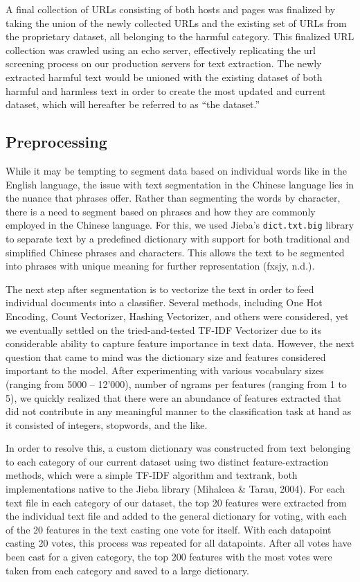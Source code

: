 \documentclass[
  titlepage]{article}
\begin{document}
A final collection of URLs consisting of both hosts and pages was
finalized by taking the union of the newly collected URLs and the
existing set of URLs from the proprietary dataset, all belonging to the
harmful category. This finalized URL collection was crawled using an
echo server, effectively replicating the url screening process on our
production servers for text extraction. The newly extracted harmful text
would be unioned with the existing dataset of both harmful and harmless
text in order to create the most updated and current dataset, which will
hereafter be referred to as ``the dataset.''

\subsection{Preprocessing}\label{preprocessing}

While it may be tempting to segment data based on individual words like
in the English language, the issue with text segmentation in the Chinese
language lies in the nuance that phrases offer. Rather than segmenting
the words by character, there is a need to segment based on phrases and
how they are commonly employed in the Chinese language. For this, we
used Jieba's \texttt{dict.txt.big} library to separate text by a
predefined dictionary with support for both traditional and simplified
Chinese phrases and characters. This allows the text to be segmented
into phrases with unique meaning for further representation (fxsjy,
n.d.).

The next step after segmentation is to vectorize the text in order to
feed individual documents into a classifier. Several methods, including
One Hot Encoding, Count Vectorizer, Hashing Vectorizer, and others were
considered, yet we eventually settled on the tried-and-tested TF-IDF
Vectorizer due to its considerable ability to capture feature importance
in text data. However, the next question that came to mind was the
dictionary size and features considered important to the model. After
experimenting with various vocabulary sizes (ranging from 5000 --
12'000), number of ngrams per features (ranging from 1 to 5), we quickly
realized that there were an abundance of features extracted that did not
contribute in any meaningful manner to the classification task at hand
as it consisted of integers, stopwords, and the like.

In order to resolve this, a custom dictionary was constructed from text
belonging to each category of our current dataset using two distinct
feature-extraction methods, which were a simple TF-IDF algorithm and
textrank, both implementations native to the Jieba library (Mihalcea \&
Tarau, 2004). For each text file in each category of our dataset, the
top 20 features were extracted from the individual text file and added
to the general dictionary for voting, with each of the 20 features in
the text casting one vote for itself. With each datapoint casting 20
votes, this process was repeated for all datapoints. After all votes
have been cast for a given category, the top 200 features with the most
votes were taken from each category and saved to a large dictionary.
\end{document}
